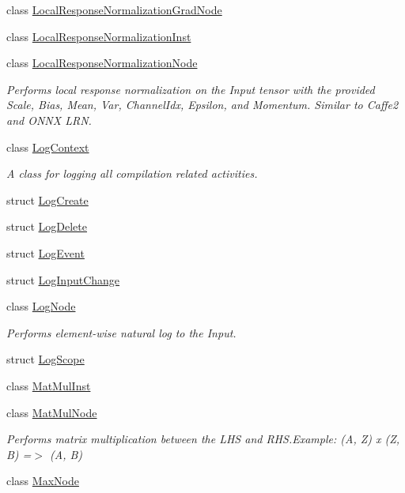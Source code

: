 \begin{DoxyCompactItemize}
\item 
class \hyperlink{classglow_1_1_local_response_normalization_grad_node}{Local\+Response\+Normalization\+Grad\+Node}
\item 
class \hyperlink{classglow_1_1_local_response_normalization_inst}{Local\+Response\+Normalization\+Inst}
\item 
class \hyperlink{classglow_1_1_local_response_normalization_node}{Local\+Response\+Normalization\+Node}
\begin{DoxyCompactList}\small\item\em Performs local response normalization on the Input tensor with the provided Scale, Bias, Mean, Var, Channel\+Idx, Epsilon, and Momentum. Similar to Caffe2 and O\+N\+NX L\+RN. \end{DoxyCompactList}\item 
class \hyperlink{classglow_1_1_log_context}{Log\+Context}
\begin{DoxyCompactList}\small\item\em A class for logging all compilation related activities. \end{DoxyCompactList}\item 
struct \hyperlink{structglow_1_1_log_create}{Log\+Create}
\item 
struct \hyperlink{structglow_1_1_log_delete}{Log\+Delete}
\item 
struct \hyperlink{structglow_1_1_log_event}{Log\+Event}
\item 
struct \hyperlink{structglow_1_1_log_input_change}{Log\+Input\+Change}
\item 
class \hyperlink{classglow_1_1_log_node}{Log\+Node}
\begin{DoxyCompactList}\small\item\em Performs element-\/wise natural log to the Input. \end{DoxyCompactList}\item 
struct \hyperlink{structglow_1_1_log_scope}{Log\+Scope}
\item 
class \hyperlink{classglow_1_1_mat_mul_inst}{Mat\+Mul\+Inst}
\item 
class \hyperlink{classglow_1_1_mat_mul_node}{Mat\+Mul\+Node}
\begin{DoxyCompactList}\small\item\em Performs matrix multiplication between the L\+HS and R\+H\+S.\+Example\+: (A, Z) x (Z, B) =$>$ (A, B) \end{DoxyCompactList}\item 
class \hyperlink{classglow_1_1_max_node}{Max\+Node}

\end{DoxyCompactItemize}
